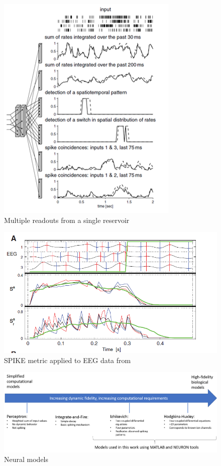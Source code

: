 \documentclass[a4paper,11pt]{article}
\begin{document}
\begin{figure}[p]
	\centering
	\includegraphics{fig/MultipleReadouts}
	\caption{Multiple readouts from a single reservoir \cite{maas2002}}
	\label{fig:lsm_multiple_readouts}
\end{figure}

\begin{figure}[p]
	\caption{SPIKE metric applied to EEG data from \cite{kreuz2012}}
	\centering
	\includegraphics[width=\textwidth]{fig/SPIKE}
\end{figure}

\begin{figure}[p]
 \caption{Neural models}
 \centering
   \includegraphics[width=\textwidth]{fig/neural_models}
\end{figure}
\end{document}
